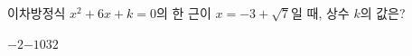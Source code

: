 이차방정식 $x^2+6x+k=0$의 한 근이 $x=-3+\sqrt{7}$일 때, 상수 $k$의 값은?
\begin{choices32}{$-2$}{$-1$}{$0$}{$3$}{$2$}\end{choices32}
